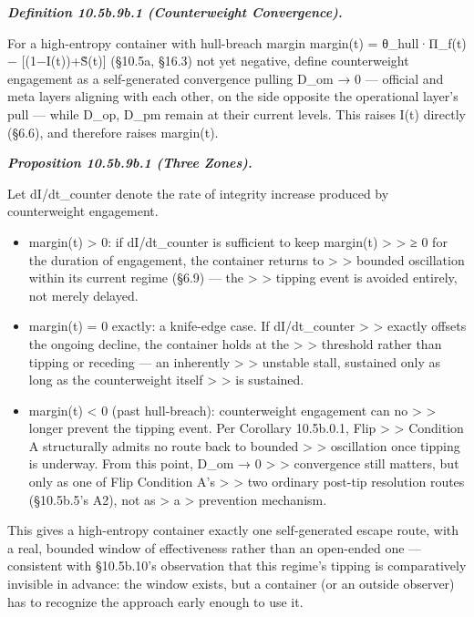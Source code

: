 \documentclass[
]{article}
\begin{document}
\emph{\textbf{Definition 10.5b.9b.1 (Counterweight Convergence).}}

For a high-entropy container with hull-breach margin margin(t) =
θ\_hull·Π\_f(t) − {[}(1−I(t))+S̃(t){]} (§10.5a, §16.3) not yet negative,
define counterweight engagement as a self-generated convergence pulling
D\_om → 0 --- official and meta layers aligning with each other, on the
side opposite the operational layer's pull --- while D\_op, D\_pm remain
at their current levels. This raises I(t) directly (§6.6), and therefore
raises margin(t).

\emph{\textbf{Proposition 10.5b.9b.1 (Three Zones).}}

Let dI/dt\textbar\_counter denote the rate of integrity increase
produced by counterweight engagement.

\begin{itemize}
\item
  margin(t) \textgreater{} 0: if dI/dt\textbar\_counter is sufficient to
  keep margin(t) \textgreater{} \textgreater{} ≥ 0 for the duration of
  engagement, the container returns to \textgreater{} \textgreater{}
  bounded oscillation within its current regime (§6.9) --- the
  \textgreater{} \textgreater{} tipping event is avoided entirely, not
  merely delayed.
\item
  margin(t) = 0 exactly: a knife-edge case. If dI/dt\textbar\_counter
  \textgreater{} \textgreater{} exactly offsets the ongoing decline, the
  container holds at the \textgreater{} \textgreater{} threshold rather
  than tipping or receding --- an inherently \textgreater{}
  \textgreater{} unstable stall, sustained only as long as the
  counterweight itself \textgreater{} \textgreater{} is sustained.
\item
  margin(t) \textless{} 0 (past hull-breach): counterweight engagement
  can no \textgreater{} \textgreater{} longer prevent the tipping event.
  Per Corollary 10.5b.0.1, Flip \textgreater{} \textgreater{} Condition
  A structurally admits no route back to bounded \textgreater{}
  \textgreater{} oscillation once tipping is underway. From this point,
  D\_om → 0 \textgreater{} \textgreater{} convergence still matters, but
  only as one of Flip Condition A's \textgreater{} \textgreater{} two
  ordinary post-tip resolution routes (§10.5b.5's A2), not as
  \textgreater{} a \textgreater{} prevention mechanism.
\end{itemize}

This gives a high-entropy container exactly one self-generated escape
route, with a real, bounded window of effectiveness rather than an
open-ended one --- consistent with §10.5b.10's observation that this
regime's tipping is comparatively invisible in advance: the window
exists, but a container (or an outside observer) has to recognize the
approach early enough to use it.
\end{document}
